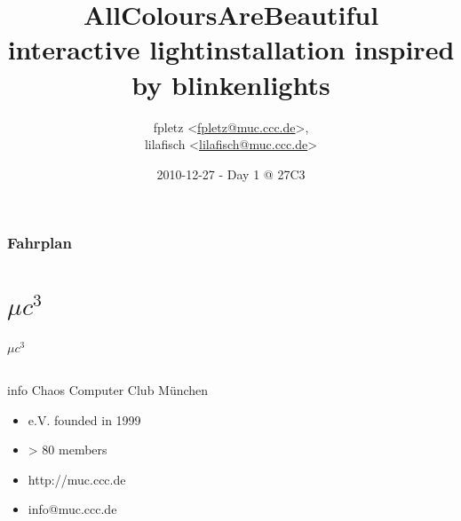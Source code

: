 \documentclass{beamer}
\title[AllColoursAreBeautiful]{AllColoursAreBeautiful\\
{\small interactive lightinstallation inspired by blinkenlights}
}
\author[fpletz, lilafisch]{fpletz <\url{fpletz@muc.ccc.de}>,\\ lilafisch <\url{lilafisch@muc.ccc.de}>}
\institute[$\mu c^{3}$]{$\mu c^{3}$ - CCC Munich }
\date{2010-12-27 - Day 1 @ 27C3}
\begin{document}
{
\begin{frame}
\thispagestyle{empty}
\titlepage
\end{frame}
}

\begin{frame}
\frametitle{Fahrplan}
\tableofcontents
\end{frame}

\setlength\fboxsep{5pt}
\setlength\fboxrule{0pt}

\section{$\mu c^{3}$}
  \begin{frame}{$\mu c^{3}$}
    \begin{columns}%
      \begin{column}{5cm}
        \begin{block}{info}
         Chaos Computer Club M\"unchen
               \begin{itemize}
            \item e.V. founded in 1999
            \item > 80 members
                  \item http://muc.ccc.de
                  \item info@muc.ccc.de
            \end{itemize}
        \end{block}


\end{column}
\end{columns}
\end{frame}
\end{document}
